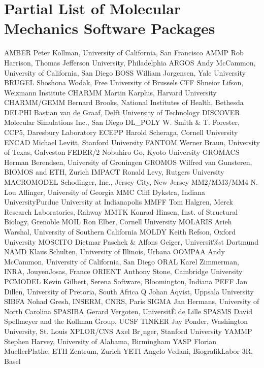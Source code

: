 \documentclass[letterpaper,11pt,english]{sphinxmanual}
\begin{document}
\section{Partial List of Molecular Mechanics Software Packages}
\label{\detokenize{text/references:partial-list-of-molecular-mechanics-software-packages}}
AMBER   Peter Kollman, University of California, San Francisco
AMMP    Rob Harrison, Thomas Jefferson University, Philadelphia
ARGOS   Andy McCammon, University of California, San Diego
BOSS    William Jorgensen, Yale University
BRUGEL  Shoshona Wodak, Free University of Brussels
CFF     Shneior Lifson, Weizmann Institute
CHARMM  Martin Karplus, Harvard University
CHARMM/GEMM     Bernard Brooks, National Institutes of Health, Bethesda
DELPHI  Bastian van de Graaf, Delft University of Technology
DISCOVER        Molecular Simulations Inc., San Diego
DL\_POLY W. Smith \& T. Forester, CCP5, Daresbury Laboratory
ECEPP   Harold Scheraga, Cornell University
ENCAD   Michael Levitt, Stanford University
FANTOM  Werner Braun, University of Texas, Galveston
FEDER/2 Nobuhiro Go, Kyoto University
GROMACS Herman Berendsen, University of Groningen
GROMOS  Wilfred van Gunsteren, BIOMOS and ETH, Zurich
IMPACT  Ronald Levy, Rutgers University
MACROMODEL      Schodinger, Inc., Jersey City, New Jersey
MM2/MM3/MM4     N. Lou Allinger, University of Georgia
MMC     Cliff Dykstra, Indiana University\sphinxhyphen{}Purdue University at Indianapolis
MMFF    Tom Halgren, Merck Research Laboratories, Rahway
MMTK    Konrad Hinsen, Inst. of Structural Biology, Grenoble
MOIL    Ron Elber, Cornell University
MOLARIS Arieh Warshal, University of Southern California
MOLDY   Keith Refson, Oxford University
MOSCITO Dietmar Paschek \& Alfons Geiger, Universit‰t Dortmund
NAMD    Klaus Schulten, University of Illinois, Urbana
OOMPAA  Andy McCammon, University of California, San Diego
ORAL    Karel Zimmerman, INRA, Jouy\sphinxhyphen{}en\sphinxhyphen{}Josas, France
ORIENT  Anthony Stone, Cambridge University
PCMODEL Kevin Gilbert, Serena Software, Bloomington, Indiana
PEFF    Jan Dillen, University of Pretoria, South Africa
Q       Johan Aqvist, Uppsala University
SIBFA   Nohad Gresh, INSERM, CNRS, Paris
SIGMA   Jan Hermans, University of North Carolina
SPASIBA Gerard Vergoten, UniversitÈ de Lille
SPASMS  David Spellmeyer and the Kollman Group, UCSF
TINKER  Jay Ponder, Washington University, St. Louis
XPLOR/CNS       Axel Br¸nger, Stanford University
YAMMP   Stephen Harvey, University of Alabama, Birmingham
YASP    Florian Mueller\sphinxhyphen{}Plathe, ETH Zentrum, Zurich
YETI    Angelo Vedani, Biografik\sphinxhyphen{}Labor 3R, Basel
\end{document}
